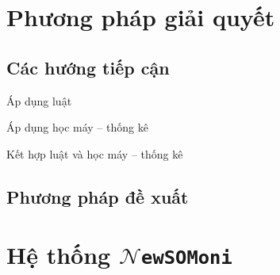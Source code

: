 \documentclass{beamer}
\numberwithin{equation}{section}
\begin{document}
\section{Phương pháp giải quyết}
  \subsection{Các hướng  tiếp cận}
  \begin{frame}{Áp dụng luật}

    \end{frame}

  \begin{frame}{Áp dụng học máy -- thống kê}

    \end{frame}

  \begin{frame}{Kết hợp luật và học máy -- thống kê}

    \end{frame}
  \subsection{Phương pháp đề xuất}




\section{Hệ thống $\mathcal{N}$\texttt{ewSOMoni}}
\end{document}
